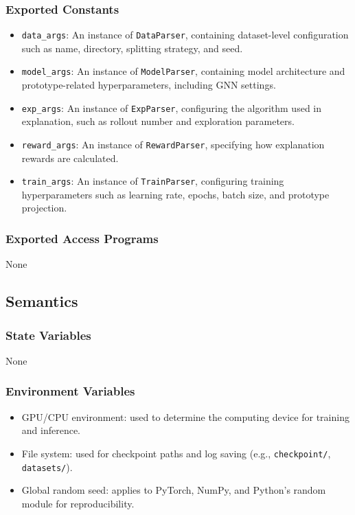 \documentclass[12pt, titlepage]{article}
\begin{document}
\subsubsection{Exported Constants}
\begin{itemize}
  \item \texttt{data\_args}: An instance of \texttt{DataParser}, containing dataset-level configuration such as name, directory, splitting strategy, and seed.
  \item \texttt{model\_args}: An instance of \texttt{ModelParser}, containing model architecture and prototype-related hyperparameters, including GNN settings.
  \item \texttt{exp\_args}: An instance of \texttt{ExpParser}, configuring the algorithm used in explanation, such as rollout number and exploration parameters.
  \item \texttt{reward\_args}: An instance of \texttt{RewardParser}, specifying how explanation rewards are calculated.
  \item \texttt{train\_args}: An instance of \texttt{TrainParser}, configuring training hyperparameters such as learning rate, epochs, batch size, and prototype projection.
\end{itemize}

\subsubsection{Exported Access Programs}
None

\subsection{Semantics}

\subsubsection{State Variables}
None

\subsubsection{Environment Variables}
\begin{itemize}
  \item GPU/CPU environment: used to determine the computing device for training and inference.
  \item File system: used for checkpoint paths and log saving (e.g., \texttt{checkpoint/}, \texttt{datasets/}).
  \item Global random seed: applies to PyTorch, NumPy, and Python’s random module for reproducibility.
\end{itemize}
\end{document}
